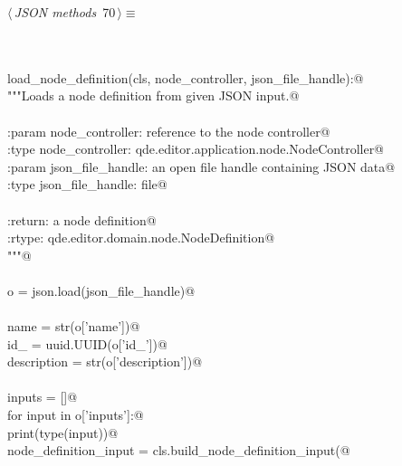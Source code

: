 \documentclass[
    a4paper,      %
    10pt,         %
    openright,    %
    notitlepage,  %
    parskip=half, %
]{scrreprt}       %
\theoremstyle{definition}                    %
\begin{document}
\begin{flushleft} \small
\begin{minipage}{\linewidth}\label{scrap116}\raggedright\small
{} $\langle\,${\itshape JSON methods}\nobreak\ {\footnotesize {70}}$\,\rangle\equiv$
\vspace{-1exm}
\begin{list}{}{} \item
\mbox{}\lstinline@@\\
\mbox{}\lstinline@classmethod@\\
\mbox{}\lstinline@def load_node_definition(cls, node_controller, json_file_handle):@\\
\mbox{}\lstinline@    """Loads a node definition from given JSON input.@\\
\mbox{}\lstinline@@\\
\mbox{}\lstinline@    :param node_controller: reference to the node controller@\\
\mbox{}\lstinline@    :type node_controller: qde.editor.application.node.NodeController@\\
\mbox{}\lstinline@    :param json_file_handle: an open file handle containing JSON data@\\
\mbox{}\lstinline@    :type json_file_handle: file@\\
\mbox{}\lstinline@@\\
\mbox{}\lstinline@    :return: a node definition@\\
\mbox{}\lstinline@    :rtype: qde.editor.domain.node.NodeDefinition@\\
\mbox{}\lstinline@    """@\\
\mbox{}\lstinline@@\\
\mbox{}\lstinline@    o = json.load(json_file_handle)@\\
\mbox{}\lstinline@@\\
\mbox{}\lstinline@    name        = str(o['name'])@\\
\mbox{}\lstinline@    id_         = uuid.UUID(o['id_'])@\\
\mbox{}\lstinline@    description = str(o['description'])@\\
\mbox{}\lstinline@@\\
\mbox{}\lstinline@    inputs = []@\\
\mbox{}\lstinline@    for input in o['inputs']:@\\
\mbox{}\lstinline@        print(type(input))@\\
\mbox{}\lstinline@        node_definition_input = cls.build_node_definition_input(@\\

\end{list}
\end{minipage}
\end{flushleft}
\end{document}
